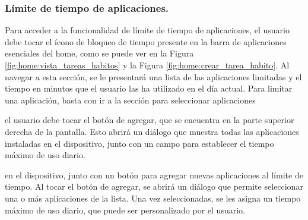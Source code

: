 \subsubsection{Límite de tiempo de aplicaciones.}

Para acceder a la funcionalidad de límite de tiempo de aplicaciones, el usuario debe tocar el ícono de bloqueo de tiempo presente en la barra de aplicaciones esenciales del home, como se puede ver en la Figura \ref{fig:home:vista_tareas_habitos} y la Figura \ref{fig:home:crear_tarea_habito}. Al navegar a esta sección, se le presentará una lista de las aplicaciones limitadas y el tiempo en minutos que el usuario las ha utilizado en el día actual. Para limitar una aplicación, basta con ir a la sección para seleccionar aplicaciones

el usuario debe tocar el botón de agregar, que se encuentra en la parte superior derecha de la pantalla. Esto abrirá un diálogo que muestra todas las aplicaciones instaladas en el dispositivo, junto con un campo para establecer el tiempo máximo de uso diario.

en el dispositivo, junto con un botón para agregar nuevas aplicaciones al límite de tiempo. Al tocar el botón de agregar, se abrirá un diálogo que permite seleccionar una o más aplicaciones de la lista. Una vez seleccionadas, se les asigna un tiempo máximo de uso diario, que puede ser personalizado por el usuario.